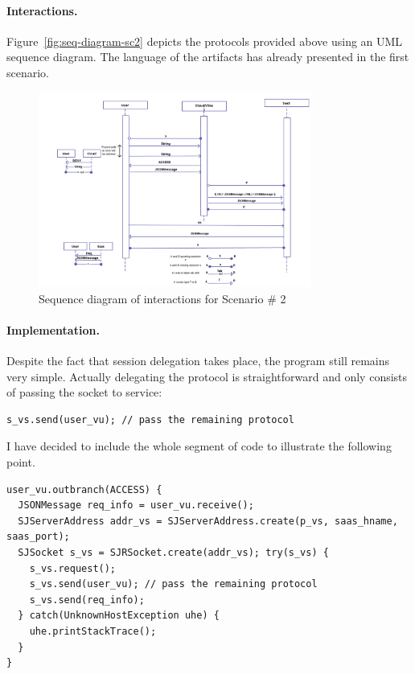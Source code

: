 \documentclass{llncs}
\begin{document}
\paragraph{Interactions.} Figure~\ref{fig:seq-diagram-sc2} depicts the protocols provided above using an UML sequence diagram. The language of the artifacts has already presented in the first scenario.

\begin{figure}
\label{fig:seq-diagram-sc2}
\centering
\includegraphics[width=0.8\textwidth]{interaction-sc2.png}
\caption{Sequence diagram of interactions for Scenario \# 2}
\label{fig:}
\end{figure}

\paragraph{Implementation.} Despite the fact that session delegation takes place, the program still remains very simple. Actually delegating the protocol is straightforward and only consists of passing the socket to service:

\begin{lstlisting}
s_vs.send(user_vu); // pass the remaining protocol
\end{lstlisting}

I have decided to include the whole segment of code to illustrate the following point. 

\begin{lstlisting}
user_vu.outbranch(ACCESS) {
  JSONMessage req_info = user_vu.receive();
  SJServerAddress addr_vs = SJServerAddress.create(p_vs, saas_hname, saas_port);
  SJSocket s_vs = SJRSocket.create(addr_vs); try(s_vs) {
    s_vs.request();
    s_vs.send(user_vu); // pass the remaining protocol    
    s_vs.send(req_info);
  } catch(UnknownHostException uhe) {
    uhe.printStackTrace(); 
  }
}
\end{lstlisting}
\end{document}
